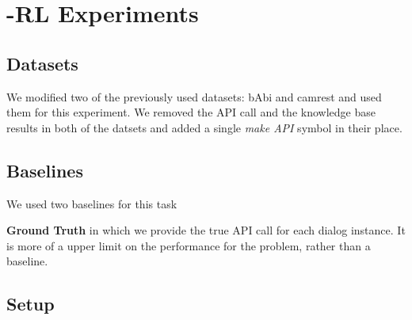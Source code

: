 \clearpage

\section{\sys -RL Experiments}

\subsection{Datasets}
We modified two of the previously used datasets: bAbi and camrest and used them for this experiment. We removed the API call and the knowledge base results in both of the datsets and added a single {\em make API} symbol in their place.

\subsection{Baselines}
We used two baselines for this task

\noindent\textbf{Ground Truth} in which we provide the true API call for each dialog instance. It is more of a upper limit on the performance for the problem, rather than a baseline. 


\subsection{Setup}